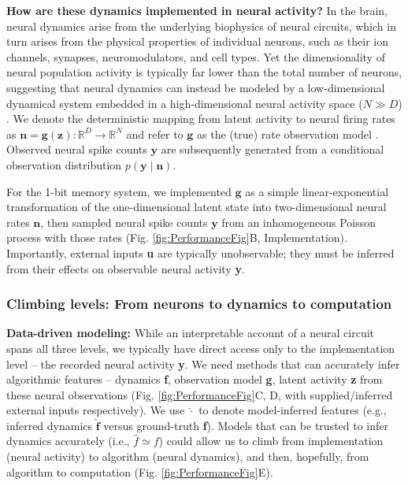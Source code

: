 \documentclass{article}
\begin{document}
\textbf{How are these dynamics implemented in neural activity?} In the brain, neural dynamics arise from the underlying biophysics of neural circuits, which in turn arises from the physical properties of individual neurons, such as their ion channels, synapses, neuromodulators, and cell types. Yet the dimensionality of neural population activity is typically far lower than the total number of neurons, suggesting that neural dynamics can instead be modeled by a low-dimensional dynamical system embedded in a high-dimensional neural activity space ($N \gg D$) \cite{shenoy_cortical_2013, gallego2017neural}. We denote the deterministic mapping from latent activity to neural firing rates as $\mathbf{n} = \mathbf{g}(\mathbf{z}) : \mathbb{R}^{D} \rightarrow \mathbb{R}^{N}$ and refer to $\mathbf{g}$ as the (true) rate observation model \cite{jazayeri_interpreting_2021, gallego2017neural, Langdon2025-yu}. Observed neural spike counts $\mathbf{y}$ are subsequently generated from a conditional observation distribution $p(\mathbf{y}\mid\mathbf{n})$.

For the 1-bit memory system, we implemented $\mathbf{g}$ as a simple linear-exponential transformation of the one-dimensional latent state into two-dimensional neural rates $\mathbf{n}$, then sampled neural spike counts $\mathbf{y}$ from an inhomogeneous Poisson process with those rates (Fig. \ref{fig:PerformanceFig}B, Implementation). Importantly, external inputs \textbf{u} are typically unobservable; they must be inferred from their effects on observable neural activity \textbf{y}.

\vspace{-0.4cm}
\subsubsection{Climbing levels: From neurons to dynamics to computation \label{sec:ClimbingLevels}}

\vspace{-0.2cm}
\textbf{Data-driven modeling:}
While an interpretable account of a neural circuit spans all three levels, we typically have direct access only to the implementation level – the recorded neural activity \textbf{y}. We need methods that can accurately infer algorithmic features – dynamics \textbf{f}, observation model \textbf{g}, latent activity \textbf{z} from these neural observations (Fig. \ref{fig:PerformanceFig}C, D, with supplied/inferred external inputs respectively). We use $\hat{\cdot}$ to denote model-inferred features (e.g., inferred dynamics $\mathbf{\hat{f}}$ versus ground-truth \textbf{f}). Models that can be trusted to infer dynamics accurately (i.e., $\hat{f} \simeq f$) could allow us to climb from implementation (neural activity) to algorithm (neural dynamics), and then, hopefully, from algorithm to computation (Fig. \ref{fig:PerformanceFig}E).
\end{document}
